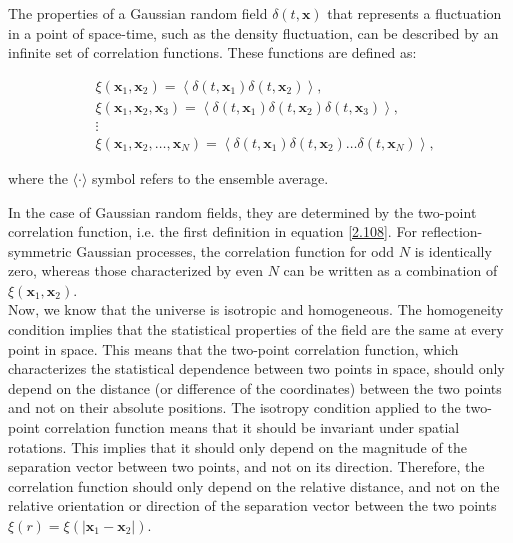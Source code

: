 The properties of a Gaussian random field $\delta(t, \mathbf{x})$ that represents a fluctuation in a point of space-time, such as the density fluctuation, can be described by an infinite set of correlation functions. These functions are defined as:

\begin{align}
    &\xi\left(\mathbf{x}_{1}, \mathbf{x}_{2}\right)= \left\langle\delta\left(t, \mathbf{x}_{1}\right) \delta\left(t, \mathbf{x}_{2}\right)\right\rangle, \label{2.108}\\
    &\xi\left(\mathbf{x}_{1}, \mathbf{x}_{2}, \mathbf{x}_{3}\right) = \left\langle\delta\left(t, \mathbf{x}_{1}\right) \delta\left(t, \mathbf{x}_{2}\right) \delta\left(t, \mathbf{x}_{3}\right)\right\rangle, \\
    & \vdots \\
    &\xi\left(\mathbf{x}_{1}, \mathbf{x}_{2}, \ldots, \mathbf{x}_{N}\right) =\left\langle\delta\left(t, \mathbf{x}_{1}\right) \delta\left(t, \mathbf{x}_{2}\right) \ldots \delta\left(t, \mathbf{x}_{N}\right)\right\rangle,
\end{align}


where the $\langle\cdot\rangle$ symbol refers to the ensemble average.

In the case of Gaussian random fields, they are determined by the two-point correlation function, i.e. the first definition in equation \ref{2.108}. For reflection-symmetric Gaussian processes, the correlation function for odd $N$ is identically zero, whereas those characterized by even $N$ can be written as a combination of $\xi\left(\mathbf{x}_{1}, \mathbf{x}_{2}\right)$.\\
Now, we know that the universe is isotropic and homogeneous. The homogeneity condition implies that the statistical properties of the field are the same at every point in space. This means that the two-point correlation function, which characterizes the statistical dependence between two points in space, should only depend on the distance (or difference of the coordinates) between the two points and not on their absolute positions. The isotropy condition applied to the two-point correlation function means that it should be invariant under spatial rotations. This implies that it should only depend on the magnitude of the separation vector between two points, and not on its direction. Therefore, the correlation function should only depend on the relative distance, and not on the relative orientation or direction of the separation vector between the two points $\xi(r)=\xi\left(\left|\mathbf{x}_{1}-\mathbf{x}_{2}\right|\right)$.

